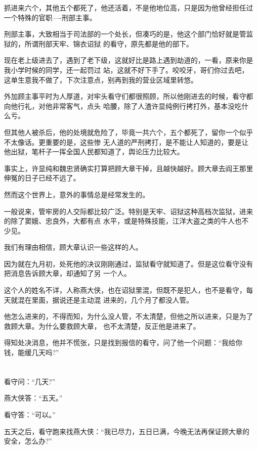 \documentclass[11pt,a4paper,onecolumn]{article}
\begin{document}
抓进来六个，其他五个都死了，他还活着，不是他地位高，只是因为他曾经担任过一个特殊的官职----刑部主事。

刑部主事，大致相当于司法部的一个处长，但凑巧的是，他这个部门恰好就是管监狱的，所谓刑部天牢、锦衣诏狱
的看守，原先都是他的部下。

现在老上级进去了，遇到了老下级，这就好比是路上遇到劫道的，一看，原来你是我小学时候的同学，还一起罚过
站，这就不好下手了。咬咬牙，哥们你过去吧，这单生意我不做了，下次注意点，别再到我的营业区域里转悠。

外加顾主事平时为人厚道，对牢头看守们都很照顾，所以他刚进去的时候，看守都向他行礼，对他非常客气，点头
哈腰，除了人渣许显纯例行拷打外，基本没吃什么亏。

但其他人被杀后，他的处境就危险了，毕竟一共六个，五个都死了，留你一个似乎不太像话。更重要的是，这些惨
无人道的严刑拷打，是不能让人知道的，要是让他出狱，笔杆子一挥全国人民都知道了，舆论压力比较大。

事实上，许显纯和魏忠贤确实打算把顾大章干掉，且越快越好。顾大章去阎王那里伸冤的日子已经不远了。

然而这个世界上，意外的事情总是经常发生的。

一般说来，管牢房的人交际都比较广泛。特别是天牢、诏狱这种高档次监狱，进来的除了窦娥、忠良外，大都有点
水平，或是特殊技能，江洋大盗之类的牛人也不少见。

我们有理由相信，顾大章认识一些这样的人。

因为就在九月初，处死他的决议刚刚通过，监狱看守就知道了。但是这位看守没有把消息告诉顾大章，却通知了另
一个人。

这个人的姓名不详，人称燕大侠，也在诏狱里混，但既不是犯人，也不是看守，每天就混在里面，据说还是主动混
进来的，几个月了都没人管。

他怎么进来的，不得而知，为什么没人管，不太清楚，但他之所以进来，只是为了救顾大章。为什么要救顾大章，
也不太清楚，反正他是进来了。

得知处决消息，他并不慌张，只是找到报信的看守，问了他一个问题：``我给你钱，能缓几天吗?''

\section[\thesection]{}

看守问：``几天?''

燕大侠答：``五天。''

看守答：``可以。''

五天之后，看守跑来找燕大侠：``我已尽力，五日已满，今晚无法再保证顾大章的安全，怎么办?''
\end{document}
